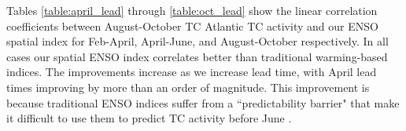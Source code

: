 \documentclass[]{article}
\begin{document}
Tables \ref{table:april_lead} through \ref{table:oct_lead} show the linear correlation coefficients between August-October TC Atlantic TC activity and our ENSO spatial index for Feb-April, April-June, and August-October respectively. In all cases our spatial ENSO index correlates better than traditional warming-based indices. The improvements increase as we increase lead time, with April lead times improving by more than an order of magnitude. This improvement is because traditional ENSO indices suffer from a ``predictability barrier" that make it difficult to use them to predict TC activity before June \cite{webster1992}.




% 
\end{document}
